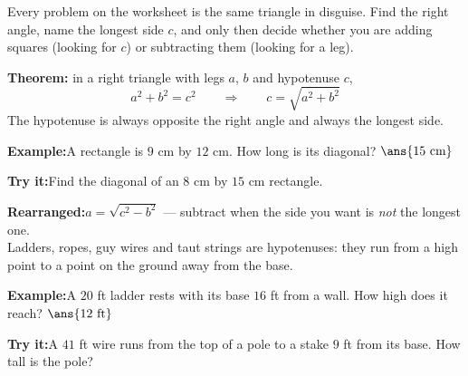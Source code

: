\documentclass[12pt]{article}
\begin{document}

\noindent\small Every problem on the worksheet is the same triangle in
disguise. Find the right angle, name the longest side $c$, and only then decide
whether you are adding squares (looking for $c$) or subtracting them (looking
for a leg).\normalsize

\begin{formulabox}
\textbf{Theorem:} in a right triangle with legs $a$, $b$ and hypotenuse $c$,
\[ a^2 + b^2 = c^2 \qquad\Longrightarrow\qquad c = \sqrt{a^2 + b^2} \]
The hypotenuse is always opposite the right angle and always the longest side.
\end{formulabox}
\begin{examplebox}
\textbf{Example:}\quad A rectangle is $9$ cm by $12$ cm. How long is its
diagonal?
$\ans{15\ \text{cm}}$
\end{examplebox}
\begin{tryitbox}
\textbf{Try it:}\quad Find the diagonal of an $8$ cm by $15$ cm rectangle.\\[2pt]
\end{tryitbox}

\begin{formulabox}
\textbf{Rearranged:}\quad $a = \sqrt{c^2 - b^2}$ \quad --- subtract when the
side you want is \emph{not} the longest one.\\[3pt]
Ladders, ropes, guy wires and taut strings are hypotenuses: they run from a
high point to a point on the ground away from the base.
\end{formulabox}
\begin{examplebox}
\textbf{Example:}\quad A $20$ ft ladder rests with its base $16$ ft from a
wall. How high does it reach?
$\ans{12\ \text{ft}}$
\end{examplebox}
\begin{tryitbox}
\textbf{Try it:}\quad A $41$ ft wire runs from the top of a pole to a stake
$9$ ft from its base. How tall is the pole?\\[2pt]
\end{tryitbox}
\end{document}
